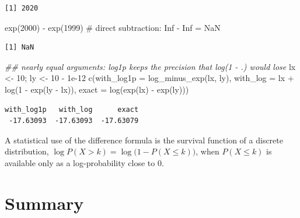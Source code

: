 \documentclass[
  letterpaper,
  DIV=11,
  numbers=noendperiod]{scrreprt}
\newenvironment{Shaded}{\begin{snugshade}}{\end{snugshade}}
\newcommand{\AttributeTok}[1]{\textcolor[rgb]{0.40,0.45,0.13}{#1}}
\newcommand{\CommentTok}[1]{\textcolor[rgb]{0.37,0.37,0.37}{#1}}
\newcommand{\DecValTok}[1]{\textcolor[rgb]{0.68,0.00,0.00}{#1}}
\newcommand{\DocumentationTok}[1]{\textcolor[rgb]{0.37,0.37,0.37}{\textit{#1}}}
\newcommand{\FloatTok}[1]{\textcolor[rgb]{0.68,0.00,0.00}{#1}}
\newcommand{\FunctionTok}[1]{\textcolor[rgb]{0.28,0.35,0.67}{#1}}
\newcommand{\NormalTok}[1]{\textcolor[rgb]{0.00,0.23,0.31}{#1}}
\newcommand{\OtherTok}[1]{\textcolor[rgb]{0.00,0.23,0.31}{#1}}
\newcommand{\SpecialCharTok}[1]{\textcolor[rgb]{0.37,0.37,0.37}{#1}}
\begin{document}
\begin{verbatim}
[1] 2020
\end{verbatim}

\begin{Shaded}
\begin{Highlighting}[]
\FunctionTok{exp}\NormalTok{(}\DecValTok{2000}\NormalTok{) }\SpecialCharTok{{-}} \FunctionTok{exp}\NormalTok{(}\DecValTok{1999}\NormalTok{)                       }\CommentTok{\# direct subtraction: Inf {-} Inf = NaN}
\end{Highlighting}
\end{Shaded}

\begin{verbatim}
[1] NaN
\end{verbatim}

\begin{Shaded}
\begin{Highlighting}[]
\DocumentationTok{\#\# nearly equal arguments: log1p keeps the precision that log(1 {-} .) would lose}
\NormalTok{lx }\OtherTok{\textless{}{-}} \DecValTok{10}\NormalTok{; ly }\OtherTok{\textless{}{-}} \DecValTok{10} \SpecialCharTok{{-}} \FloatTok{1e{-}12}
\FunctionTok{c}\NormalTok{(}\AttributeTok{with\_log1p =} \FunctionTok{log\_minus\_exp}\NormalTok{(lx, ly), }\AttributeTok{with\_log =}\NormalTok{ lx }\SpecialCharTok{+} \FunctionTok{log}\NormalTok{(}\DecValTok{1} \SpecialCharTok{{-}} \FunctionTok{exp}\NormalTok{(ly }\SpecialCharTok{{-}}\NormalTok{ lx)), }\AttributeTok{exact =} \FunctionTok{log}\NormalTok{(}\FunctionTok{exp}\NormalTok{(lx) }\SpecialCharTok{{-}} \FunctionTok{exp}\NormalTok{(ly)))}
\end{Highlighting}
\end{Shaded}

\begin{verbatim}
with_log1p   with_log      exact 
 -17.63093  -17.63093  -17.63079 
\end{verbatim}

A statistical use of the difference formula is the survival function of
a discrete distribution,
\(\log P(X > k) = \log\big(1 - P(X\le k)\big)\), when \(P(X\le k)\) is
available only as a log-probability close to \(0\).

\section{Summary}\label{summary}
\end{document}

